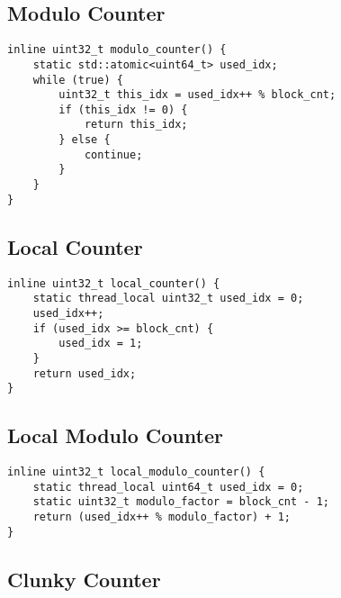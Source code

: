 \subsection[Modulo Counter]{Modulo Counter} \label{subsec:modulo_counter}

\begin{@empty}
    \lstset{
        language = [ISO]C++,
        style = basic
    }
    \begin{lstlisting}
inline uint32_t modulo_counter() {
    static std::atomic<uint64_t> used_idx;
    while (true) {
        uint32_t this_idx = used_idx++ % block_cnt;
        if (this_idx != 0) {
            return this_idx;
        } else {
            continue;
        }
    }
}
    \end{lstlisting}
\end{@empty}

\subsection[Local Counter]{Local Counter} \label{subsec:local_counter}

\begin{@empty}
    \lstset{
        language = [ISO]C++,
        style = basic
    }
    \begin{lstlisting}
inline uint32_t local_counter() {
    static thread_local uint32_t used_idx = 0;
    used_idx++;
    if (used_idx >= block_cnt) {
        used_idx = 1;
    }
    return used_idx;
}
    \end{lstlisting}
\end{@empty}

\subsection[Local Modulo Counter]{Local Modulo Counter} \label{subsec:local_modulo_counter}

\begin{@empty}
    \lstset{
        language = [ISO]C++,
        style = basic
    }
    \begin{lstlisting}
inline uint32_t local_modulo_counter() {
    static thread_local uint64_t used_idx = 0;
    static uint32_t modulo_factor = block_cnt - 1;
    return (used_idx++ % modulo_factor) + 1;
}
    \end{lstlisting}
\end{@empty}

\subsection[Clunky Counter]{Clunky Counter} \label{subsec:clunky_counter}

